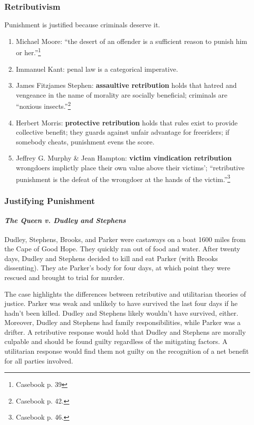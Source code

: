 \subsubsection{Retributivism}

Punishment is justified because criminals deserve it.

\begin{enumerate}
    \item Michael Moore: ``the desert of an offender is a sufficient reason to punish him or her.''\footnote{Casebook p. 39}
    \item Immanuel Kant: penal law is a categorical imperative.
    \item James Fitzjames Stephen: \textbf{assaultive retribution} holds that hatred and vengeance in the name of morality are socially beneficial; criminals are ``noxious insects.''\footnote{Casebook p. 42.}
    \item Herbert Morris: \textbf{protective retribution} holds that rules exist to provide collective benefit; they guards against unfair advantage for freeriders; if somebody cheats, punishment evens the score.
    \item Jeffrey G. Murphy \& Jean Hampton: \textbf{victim vindication retribution} wrongdoers implictly place their own value above their victims'; ``retributive punishment is the defeat of the wrongdoer at the hands of the victim.''\footnote{Casebook p. 46.}
\end{enumerate}

\subsubsection{Justifying Punishment}

\paragraph{\emph{The Queen v. Dudley and Stephens}}

Dudley, Stephens, Brooks, and Parker were castaways on a boat 1600 miles from the Cape of Good Hope. They quickly ran out of food and water. After twenty days, Dudley and Stephens decided to kill and eat Parker (with Brooks dissenting). They ate Parker’s body for four days, at which point they were rescued and brought to trial for murder.

The case highlights the differences between retributive and utilitarian theories of justice. Parker was weak and unlikely to have survived the last four days if he hadn’t been killed. Dudley and Stephens likely wouldn’t have survived, either. Moreover, Dudley and Stephens had family responsibilities, while Parker was a drifter. A retributive response would hold that Dudley and Stephens are morally culpable and should be found guilty regardless of the mitigating factors. A utilitarian response would find them not guilty on the recognition of a net benefit for all parties involved.

